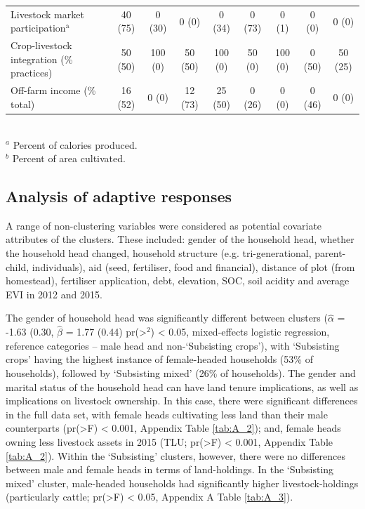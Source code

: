 \begin{table}
\begin{tabular}{L{3.8cm}cccccccc}
Livestock market participation$^{\mathrm{a}}$ & 40 (75) & 0 (30) & 0 (0) & 0 (34) & 0 (73) & 0 (1) & 0 (0) & 0 (0) \\
Crop-livestock integration (\% practices) & 50 (50) & 100 (0) & 50 (50) & 100 (0) & 50 (0) & 100 (0) & 0 (50) & 50 (25) \\
Off-farm income (\% total) & 16 (52) & 0 (0) & 12 (73) & 25 (50) & 0 (26) & 0 (0) & 0 (46) & 0 (0)  \\
\bottomrule
\end{tabular}
\footnotesize
\raggedright
\\
$^{a}$ Percent of calories produced.\\
$^{b}$ Percent of area cultivated. \\%
\end{table}




\subsection{Analysis of adaptive responses}

A range of non-clustering variables were considered as potential covariate attributes of the clusters. These included: gender of the household head, whether the household head changed, household structure (e.g. tri-generational, parent-child, individuals), aid (seed, fertiliser, food and financial), distance of plot (from homestead), fertiliser application, debt, elevation, SOC, soil acidity and average EVI in 2012 and 2015.

The gender of household head was significantly different between clusters ($\hat{\alpha}$ = -1.63 (0.30, $\hat{\beta}$ = 1.77 (0.44) pr(\textgreater{\textbar}{\chi}$^2${\textbar}) {\textless} 0.05, mixed-effects logistic regression, reference categories -- male head and non-`Subsisting crops'), with `Subsisting crops' having the highest instance of female-headed households (53\% of households), followed by `Subsisting mixed' (26\% of households). The gender and marital status of the household head can have land tenure implications, as well as implications on livestock ownership. In this case, there were significant differences in the full data set, with female heads cultivating less land than their male counterparts (pr(\textgreater{\textbar}F{\textbar}) {\textless} 0.001, Appendix Table \ref{tab:A_2}); and, female heads owning less livestock assets in 2015 (TLU; pr(\textgreater{\textbar}F{\textbar}) {\textless} 0.001, Appendix Table \ref{tab:A_2}). Within the `Subsisting' clusters, however, there were no differences between male and female heads in terms of land-holdings. In the `Subsisting mixed' cluster, male-headed households had significantly higher livestock-holdings (particularly cattle; pr(\textgreater{\textbar}F{\textbar}) {\textless} 0.05, Appendix A Table \ref{tab:A_3}).

